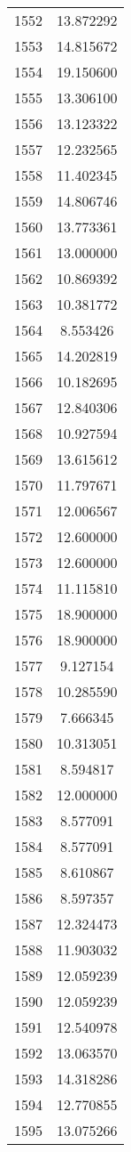 \documentclass[12pt]{article}
\begin{document}
\begin{longtable}{@{}cc@{}}
1552 & 13.872292 \\
1553 & 14.815672 \\
1554 & 19.150600 \\
1555 & 13.306100 \\
1556 & 13.123322 \\
1557 & 12.232565 \\
1558 & 11.402345 \\
1559 & 14.806746 \\
1560 & 13.773361 \\
1561 & 13.000000 \\
1562 & 10.869392 \\
1563 & 10.381772 \\
1564 & 8.553426 \\
1565 & 14.202819 \\
1566 & 10.182695 \\
1567 & 12.840306 \\
1568 & 10.927594 \\
1569 & 13.615612 \\
1570 & 11.797671 \\
1571 & 12.006567 \\
1572 & 12.600000 \\
1573 & 12.600000 \\
1574 & 11.115810 \\
1575 & 18.900000 \\
1576 & 18.900000 \\
1577 & 9.127154 \\
1578 & 10.285590 \\
1579 & 7.666345 \\
1580 & 10.313051 \\
1581 & 8.594817 \\
1582 & 12.000000 \\
1583 & 8.577091 \\
1584 & 8.577091 \\
1585 & 8.610867 \\
1586 & 8.597357 \\
1587 & 12.324473 \\
1588 & 11.903032 \\
1589 & 12.059239 \\
1590 & 12.059239 \\
1591 & 12.540978 \\
1592 & 13.063570 \\
1593 & 14.318286 \\
1594 & 12.770855 \\
1595 & 13.075266 \\

\end{longtable}
\end{document}
